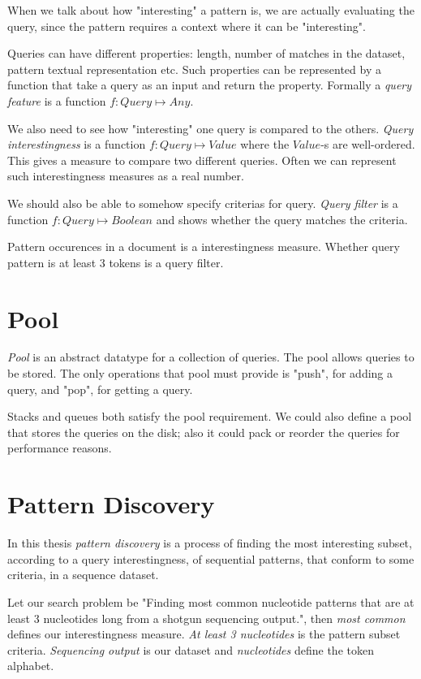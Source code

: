 When we talk about how "interesting" a pattern is, we are actually evaluating the query, since the pattern requires a context where it can be "interesting".

Queries can have different properties: length, number of matches in the dataset, pattern textual representation etc. Such properties can be represented by a function that take a query as an input and return the property. Formally a \emph{query feature} is a function $f: Query \mapsto Any$.

We also need to see how "interesting" one query is compared to the others. \emph{Query interestingness} is a function $f: Query \mapsto Value$ where the $Value$-s are well-ordered. This gives a measure to compare two different queries. Often we can represent such interestingness measures as a real number.

We should also be able to somehow specify criterias for query. \emph{Query filter} is a function $f: Query \mapsto Boolean$ and shows whether the query matches the criteria.

\begin{exmp}
Pattern occurences in a document is a interestingness measure. Whether query pattern is at least 3 tokens is a query filter.
\end{exmp}

\section{Pool}

\emph{Pool} is an abstract datatype for a collection of queries. The pool allows queries to be stored. The only operations that pool must provide is "push", for adding a query, and "pop", for getting a query.

\begin{exmp}
Stacks and queues both satisfy the pool requirement. We could also define a pool that stores the queries on the disk; also it could pack or reorder the queries for performance reasons.
\end{exmp}

\section{Pattern Discovery}

In this thesis \emph{pattern discovery} is a process of finding the most interesting subset, according to a query interestingness, of sequential patterns, that conform to some criteria, in a sequence dataset.

\begin{exmp}
Let our search problem be "Finding most common nucleotide patterns that are at least 3 nucleotides long from a shotgun sequencing output.", then \emph{most common} defines our interestingness measure. \emph{At least 3 nucleotides} is the pattern subset criteria. \emph{Sequencing output} is our dataset and \emph{nucleotides} define the token alphabet.
\end{exmp}